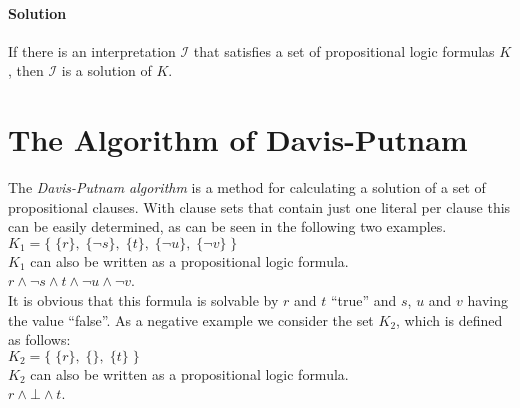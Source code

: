 \paragraph{Solution}
If there is an interpretation $\mathcal{I}$ that satisfies a set of propositional logic formulas $K$, then $\mathcal{I}$ is a solution of $K$.

\section{The Algorithm of Davis-Putnam}
\label{sec:sciDavisPutnam}
The \textit{Davis-Putnam algorithm} is a method for calculating a solution of a set of propositional clauses. With clause sets that contain just one literal per clause this can be easily determined, as can be seen in the following two examples.
\\[0.2cm]
\hspace*{1.3cm} $K_1 = \bigl\{\; \{r\},\; \{\neg s\},\; \{t\},\; \{\neg u\}, \; \{\neg v\} \;\bigr\}$ 
\\[0.2cm]
$K_1$ can also be written as a propositional logic formula.
\\[0.2cm]
\hspace*{1.3cm} $r \land \neg s \land t \land \neg u \land \neg v$.
\\[0.2cm]
It is obvious that this formula is solvable by $r$ and $t$ \enquote{true} and $s$, $u$ and $v$ having the value \enquote{false}.
As a negative example we consider the set $K_2$, which is defined as follows:
\\[0.2cm]
\hspace*{1.3cm} $K_2 = \bigl\{\; \{r\},\; \{\},\; \{t\} \;\bigr\}$
\\[0.2cm]
$K_2$ can also be written as a propositional logic formula.
\\[0.2cm]
\hspace*{1.3cm}
$r \land \bot \land t$.
